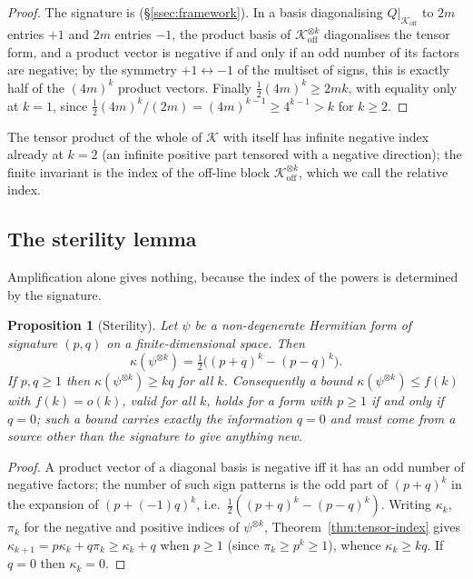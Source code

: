 \documentclass[11pt]{amsart}
\newtheorem{proposition}[theorem]{Proposition}
\theoremstyle{definition}
\theoremstyle{remark}
\newcommand{\Koff}{\mathcal{K}_{\mathrm{off}}}
\newcommand{\Kcal}{\mathcal{K}}
\begin{document}
\begin{proof}
The signature is \cite[Prop.~4.7]{P25} (\S\ref{ssec:framework}). In a basis diagonalising
$Q|_{\Koff}$ to $2m$ entries $+1$ and $2m$ entries $-1$, the product basis of $\Koff^{\otimes k}$
diagonalises the tensor form, and a product vector is negative if and only if an odd number of
its factors are negative; by the symmetry $+1\leftrightarrow-1$ of the multiset of signs, this
is exactly half of the $(4m)^k$ product vectors. Finally $\tfrac12(4m)^k\ge 2mk$, with equality
only at $k=1$, since $\tfrac12(4m)^k/(2m)=(4m)^{k-1}\ge4^{k-1}>k$ for $k\ge2$.
\end{proof}

The tensor product of the whole of $\Kcal$ with itself has infinite negative index already at
$k=2$ (an infinite positive part tensored with a negative direction); the finite invariant is
the index of the off-line block $\Koff^{\otimes k}$, which we call the relative index.

\subsection{The sterility lemma}
Amplification alone gives nothing, because the index of the powers is determined by the
signature.

\begin{proposition}[Sterility]\label{prop:sterility}
Let $\psi$ be a non-degenerate Hermitian form of signature $(p,q)$ on a finite-dimensional space.
Then
\[
\kappa(\psi^{\otimes k})=\tfrac12\bigl((p+q)^k-(p-q)^k\bigr).
\]
If $p,q\ge1$ then $\kappa(\psi^{\otimes k})\ge kq$ for all $k$. Consequently a bound
$\kappa(\psi^{\otimes k})\le f(k)$ with $f(k)=o(k)$, valid for all $k$, holds for a form with
$p\ge1$ if and only if $q=0$; such a bound carries exactly the information $q=0$ and must
come from a source other than the signature to give anything new.
\end{proposition}

\begin{proof}
A product vector of a diagonal basis is negative iff it has an odd number of negative
factors; the number of such sign patterns is the odd part of $(p+q)^k$ in the expansion of
$(p+(-1)q)^k$, i.e.\ $\tfrac12((p+q)^k-(p-q)^k)$. Writing $\kappa_k$, $\pi_k$ for the negative and
positive indices of $\psi^{\otimes k}$, Theorem~\ref{thm:tensor-index} gives
$\kappa_{k+1}=p\kappa_k+q\pi_k\ge\kappa_k+q$ when $p\ge1$ (since $\pi_k\ge p^k\ge1$), whence
$\kappa_k\ge kq$. If $q=0$ then $\kappa_k=0$.
\end{proof}
\end{document}
